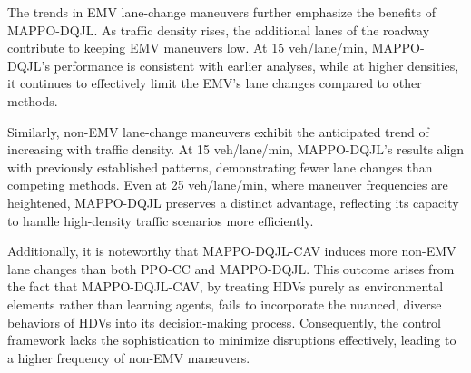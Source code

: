 The trends in EMV lane-change maneuvers further emphasize the benefits of MAPPO-DQJL. As traffic density rises, the additional lanes of the roadway contribute to keeping EMV maneuvers low. At 15 veh/lane/min, MAPPO-DQJL's performance is consistent with earlier analyses, while at higher densities, it continues to effectively limit the EMV's lane changes compared to other methods.

Similarly, non-EMV lane-change maneuvers exhibit the anticipated trend of increasing with traffic density. At 15 veh/lane/min, MAPPO-DQJL’s results align with previously established patterns, demonstrating fewer lane changes than competing methods. Even at 25 veh/lane/min, where maneuver frequencies are heightened, MAPPO-DQJL preserves a distinct advantage, reflecting its capacity to handle high-density traffic scenarios more efficiently.

Additionally, it is noteworthy that MAPPO-DQJL-CAV induces more non-EMV lane changes than both PPO-CC and MAPPO-DQJL. This outcome arises from the fact that MAPPO-DQJL-CAV, by treating HDVs purely as environmental elements rather than learning agents, fails to incorporate the nuanced, diverse behaviors of HDVs into its decision-making process. Consequently, the control framework lacks the sophistication to minimize disruptions effectively, leading to a higher frequency of non-EMV maneuvers.

